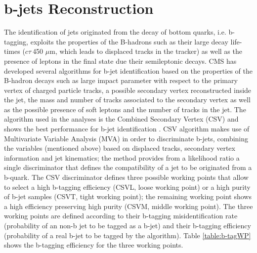 \section{b-jets Reconstruction}
\label{sec:Jet}
The identification of jets originated from the decay of bottom quarks, i.e. b-tagging, exploits 
the properties of the B-hadrons such as their large decay life-times ($c\tau~$450 $\mu$m, which leads
to displaced tracks in the tracker) as well as the presence of leptons in the final 
state due their semileptonic decays. CMS has developed 
several algorithms for b-jet identification \cite{Chatrchyan:2012jua} based on 
the properties of the B-hadron decays such as large impact parameter with respect to the primary 
vertex of charged particle tracks, a possible secondary vertex 
reconstructed inside the jet, the mass and number of tracks associated to the secondary
vertex as well as the possible presence of soft leptons and the number of tracks in the jet. The 
algorithm used in the analyses is the Combined Secondary Vertex (CSV) and shows the best 
performance for b-jet identification \cite{CMS:2013vea}. CSV algorithm makes 
use of Multivariate Variable Analysis (MVA) in order to  
discriminate b-jets, combining the variables (mentioned above) based 
on displaced tracks, secondary vertex information and jet kinematics; the method
provides from a likelihood ratio a single discriminator that defines the compatibility of a jet to be originated
from a b-quark. The CSV discriminator defines three possible working points that 
allow to select a high b-tagging efficiency (CSVL, loose working point) or 
a high purity of b-jet samples (CSVT, tight working point); the remaining
working point shows a high efficiency preserving high purity 
(CSVM, middle working point). The three working points are defined 
according to their b-tagging misidentification rate (probability of an non-b jet to be tagged as a b-jet)
and their b-tagging efficiency (probability of a real b-jet to be tagged by the algorithm). Table 
\ref{table:b-tagWP} shows the b-tagging efficiency for the three working points.\\


